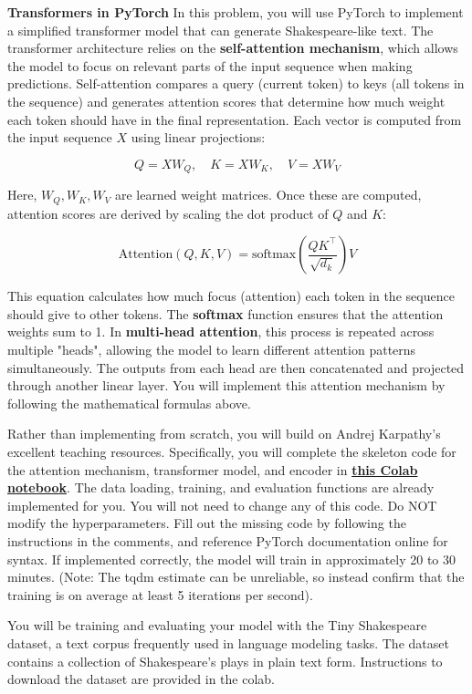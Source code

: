 \item {} {\bf Transformers in PyTorch}
In this problem, you will use PyTorch to implement a simplified transformer model that can generate Shakespeare-like text. The transformer architecture relies on the \textbf{self-attention mechanism}, which allows the model to focus on relevant parts of the input sequence when making predictions. Self-attention compares a query (current token) to keys (all tokens in the sequence) and generates attention scores that determine how much weight each token should have in the final representation. Each vector is computed from the input sequence \( X \) using linear projections:

\[
Q = X W_Q, \quad K = X W_K, \quad V = X W_V
\]

Here, \( W_Q, W_K, W_V \) are learned weight matrices. Once these are computed, attention scores are derived by scaling the dot product of \( Q \) and \( K \):

\[
\text{Attention}(Q, K, V) = \text{softmax}\left( \frac{Q K^\top}{\sqrt{d_k}} \right) V
\]

This equation calculates how much focus (attention) each token in the sequence should give to other tokens. The \textbf{softmax} function ensures that the attention weights sum to 1. In \textbf{multi-head attention}, this process is repeated across multiple "heads", allowing the model to learn different attention patterns simultaneously. The outputs from each head are then concatenated and projected through another linear layer. You will implement this attention mechanism by following the mathematical formulas above.

Rather than implementing from scratch, you will build on Andrej Karpathy’s excellent teaching resources. Specifically, you will complete the skeleton code for the attention mechanism, transformer model, and encoder in \href{https://colab.research.google.com/drive/1T4mnkBUL4VSKMpTPOn_HAzpZTwQhMSqD?usp=sharing}{\textbf{this Colab notebook}}. The data loading, training, and evaluation functions
are already implemented for you. You will not need to change any of this code. Do NOT modify the hyperparameters. Fill out the missing code by following the instructions in the comments, and reference PyTorch documentation online for syntax. If implemented correctly, the model will train in approximately 20 to 30 minutes. (Note: The tqdm estimate can be unreliable, so instead confirm that the training is on average at least 5 iterations per second).

You will be training and evaluating your model with the Tiny Shakespeare dataset, a text corpus frequently used in language modeling tasks. The dataset contains a collection of Shakespeare's plays in plain text form. Instructions to download the dataset are provided in the colab.

